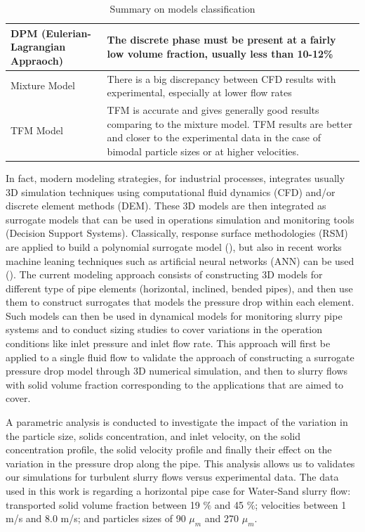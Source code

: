 \documentclass[11pt]{report}
\begin{document}
\begin{table}[h!]
\centering
\begin{tabular}{p{6.0cm}|p{9.0cm}}
\hline\hline
DPM (Eulerian-Lagrangian Appraoch) &
The discrete phase must be present at a fairly low volume fraction, usually less than 10-12\% \\ \hline
Mixture Model &
There is a big discrepancy between CFD results with experimental, especially at lower flow rates \\ \hline{}
TFM Model &
TFM is accurate and gives generally good results comparing to the mixture model. TFM results are better and closer to the experimental data in the case of bimodal particle sizes or at higher velocities. \\ \hline\hline
\end{tabular}
\caption{Summary on models classification}
\label{tab:summ-mods-app}
\end{table}
%
In fact,  modern modeling strategies, for industrial processes, integrates usually 3D simulation techniques using computational fluid dynamics (CFD) and/or discrete element methods (DEM). 
%
These 3D models are then integrated as surrogate models that can be used in operations simulation and monitoring tools (Decision Support Systems). 
%
Classically, response surface methodologies (RSM) are applied to build a polynomial surrogate model (\citet{Rabhi}), but also in recent works machine leaning techniques such as artificial neural networks (ANN) can be used (\citet{Seong}). 
%
The current modeling approach consists of  constructing 3D models for different type of pipe elements (horizontal, inclined, bended pipes), and then use them to construct surrogates that models the pressure drop within each element. 
%
Such models can then be used in dynamical models for monitoring slurry pipe systems and to conduct sizing studies to cover variations in the operation conditions like inlet pressure and inlet flow rate. 
%
This approach will first be applied to a single fluid flow to validate the approach of constructing a surrogate pressure drop model through 3D numerical simulation, 
%
and then to slurry flows with solid volume fraction corresponding to the applications that are aimed to cover.

A parametric analysis is conducted to investigate the impact of the variation in the particle size, solids concentration, and inlet velocity, 
%
on the solid concentration profile, the solid velocity profile and finally their effect on the variation in the pressure drop along the pipe. 
%
This analysis allows us to validates our simulations for turbulent slurry flows versus experimental data. 
%
The data used in this work is regarding a horizontal pipe case for Water-Sand slurry flow: transported solid volume fraction between 19  $\%$ and 45 $\%$; velocities between 1 m/s and 8.0 m/s; and particles sizes of 90 $\mu_m$ and 270 $\mu_m$. 
\end{document}
